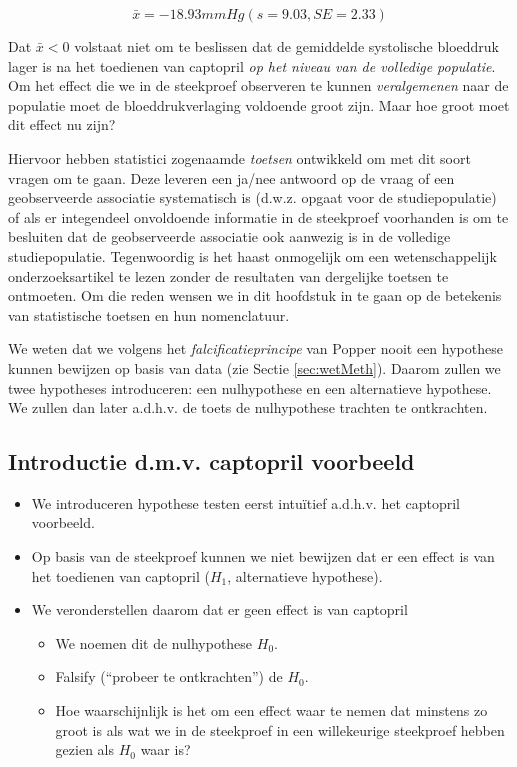\documentclass[
  12pt,dutch,coursenotes]{book}
\begin{document}
\[\bar x=-18.93mmHg (s = 9.03, SE = 2.33)\]

Dat \(\bar{x}< 0\) volstaat niet om te beslissen dat de gemiddelde systolische bloeddruk lager is na het toedienen van captopril \emph{op het niveau van de volledige populatie}. Om het effect die we in de steekproef observeren te kunnen \emph{veralgemenen} naar de populatie moet de bloeddrukverlaging voldoende groot zijn. Maar hoe groot moet dit effect nu zijn?

Hiervoor hebben statistici zogenaamde \emph{toetsen} ontwikkeld om met dit soort vragen om te gaan. Deze leveren een ja/nee antwoord op de vraag of een geobserveerde associatie systematisch is (d.w.z. opgaat voor de studiepopulatie) of als er integendeel onvoldoende informatie in de steekproef voorhanden is om te besluiten dat de geobserveerde associatie ook aanwezig is in de volledige studiepopulatie. Tegenwoordig is het
haast onmogelijk om een wetenschappelijk onderzoeksartikel te lezen zonder
de resultaten van dergelijke toetsen te ontmoeten. Om die reden wensen we in
dit hoofdstuk in te gaan op de betekenis van statistische toetsen en hun
nomenclatuur.

We weten dat we volgens het \emph{falcificatieprincipe} van Popper nooit een hypothese kunnen bewijzen op basis van data (zie Sectie \ref{sec:wetMeth}).
Daarom zullen we twee hypotheses introduceren: een nulhypothese en een alternatieve hypothese.
We zullen dan later a.d.h.v. de toets de nulhypothese trachten te ontkrachten.

\hypertarget{introductie-d.m.v.-captopril-voorbeeld}{%
\subsection{Introductie d.m.v. captopril voorbeeld}\label{introductie-d.m.v.-captopril-voorbeeld}}

\begin{itemize}
\item
  We introduceren hypothese testen eerst intuïtief a.d.h.v. het captopril voorbeeld.
\item
  Op basis van de steekproef kunnen we niet bewijzen dat er een effect is van het toedienen van captopril (\(H_1\), alternatieve hypothese).
\item
  We veronderstellen daarom dat er geen effect is van captopril

  \begin{itemize}
  \item
    We noemen dit de nulhypothese \(H_0\).
  \item
    Falsify (``probeer te ontkrachten'') de \(H_0\).
  \item
    Hoe waarschijnlijk is het om een effect waar te nemen dat minstens zo groot is als wat we in de steekproef in een willekeurige steekproef hebben gezien als \(H_0\) waar is?
  \end{itemize}
\end{itemize}
\end{document}
